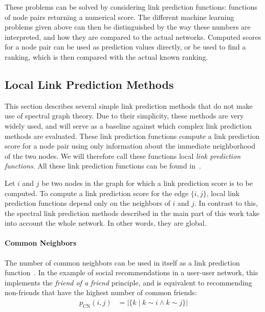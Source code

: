 \documentclass[11pt,a4paper]{book}
\begin{document}
These problems can be solved by considering link prediction functions:
functions of node pairs returning a numerical score.  The different machine
learning problems given above can then be distinguished by the way these
numbers are 
interpreted, and how they are compared to the actual networks.  Computed
scores for a node pair can be used as prediction values directly, or be
used to find a ranking, which is then compared with the actual known
ranking.

\subsection{Local Link Prediction Methods}
\label{sec:basic-link-prediction-methods}
This section describes several simple link prediction methods 
that do not make use of spectral graph theory. 
Due to their simplicity, these methods are very widely used, and will
serve as a baseline against which complex link prediction methods are
evaluated. 
These link prediction functions compute a link prediction score for a
node pair using only information about the immediate neighborhood
of the two nodes.
We will therefore call these functions local \emph{link prediction
  functions}.
All these link prediction functions can be found in~\cite{b256}.   

Let $i$ and $j$ be two nodes in the graph for which a link prediction
score is to be computed.  To compute a link prediction score for the
edge $\{i,j\}$, local link prediction functions depend only on
the neighbors of $i$ and $j$.  
In contrast to this, the spectral link prediction methods described in
the main part of this work take into account the whole network.
In other words, they are global. 

\paragraph{Common Neighbors}
The number of common neighbors can be used in itself as a link
prediction function~\cite{b256}.  In the example of social
recommendations in a user-user network, this implements the \emph{friend
  of a friend} principle, and is equivalent to
recommending non-friends that have the highest number of common friends:
\begin{align}
  p_{\mathrm{CN}}(i,j) &= |\{ k \mid k \sim i \land k \sim j \}|
  \label{eq:common-neighbors}
\end{align}
\end{document}
